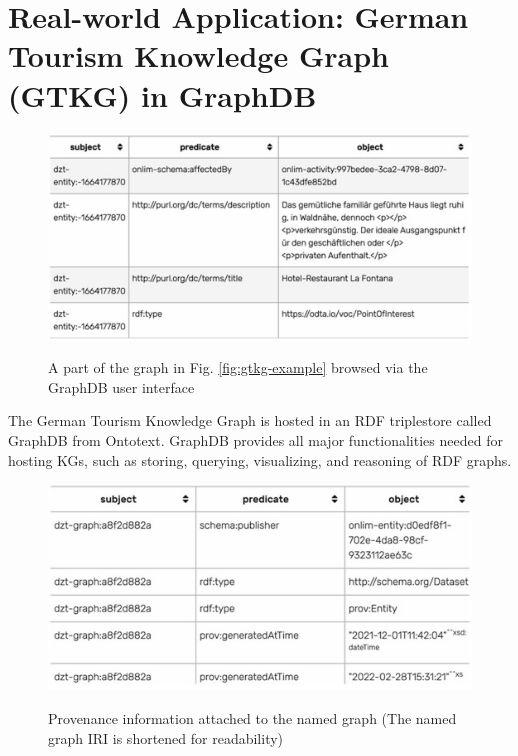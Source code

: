 \documentclass[12pt]{article}
\begin{document}
\section{Real-world Application: German Tourism Knowledge Graph (GTKG) in GraphDB}
\begin{figure}
    \includegraphics[width=\linewidth]{imgs/GraphDB user interface.jpeg}
    \label{fig:graphdb-ui}
    \caption{A part of the graph in Fig. \ref{fig:gtkg-example} browsed via the GraphDB user interface}
\end{figure}
The German Tourism Knowledge Graph is hosted in an RDF triplestore called GraphDB from Ontotext. GraphDB provides all major functionalities needed for hosting KGs, such as storing, querying, visualizing, and reasoning of RDF graphs.
\begin{figure}
    \includegraphics[width=\linewidth]{imgs/named graph.jpeg}
    \label{fig:named-graph}
    \caption{Provenance information attached to the named graph (The named graph IRI is shortened
        for readability)}
\end{figure}
\end{document}

